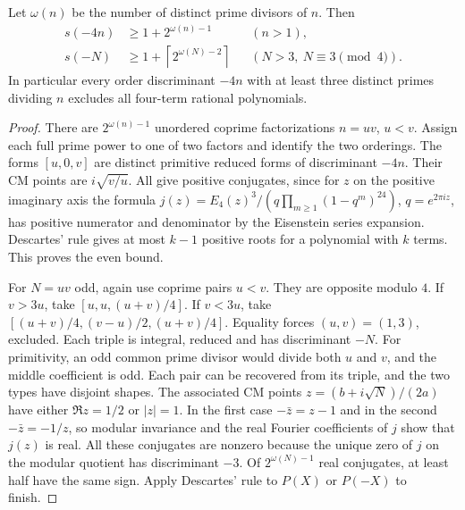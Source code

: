 \begin{proposition}
Let $\omega(n)$ be the number of distinct prime divisors of $n$. Then
\[
\begin{aligned}
 s(-4n)&\ge 1+2^{\omega(n)-1} &&(n>1),\\
 s(-N)&\ge 1+\left\lceil 2^{\omega(N)-2}\right\rceil
 &&(N>3,\ N\equiv3\pmod4).
\end{aligned}
\]
In particular every order discriminant $-4n$ with at least three distinct
primes dividing $n$ excludes all four-term rational polynomials.
\end{proposition}
\begin{proof}
There are $2^{\omega(n)-1}$ unordered coprime factorizations $n=uv$,
$u<v$. Assign each full prime power to one of two factors and identify the
two orderings. The forms $[u,0,v]$ are distinct primitive reduced forms
of discriminant $-4n$. Their CM points are $i\sqrt{v/u}$. All give positive
conjugates, since for $z$ on the positive imaginary axis the formula
$j(z)=E_4(z)^3/(q\prod_{m\ge1}(1-q^m)^{24})$, $q=e^{2\pi iz}$, has
positive numerator and denominator by the Eisenstein series expansion.
Descartes' rule gives at most $k-1$ positive roots for a polynomial with
$k$ terms. This proves the even bound.

For $N=uv$ odd, again use coprime pairs $u<v$. They are opposite modulo
$4$. If $v>3u$, take $[u,u,(u+v)/4]$. If $v<3u$, take
$[(u+v)/4,(v-u)/2,(u+v)/4]$. Equality forces $(u,v)=(1,3)$, excluded.
Each triple is integral, reduced and has discriminant $-N$. For
primitivity, an odd common prime divisor would divide both $u$ and $v$,
and the middle coefficient is odd. Each pair can be recovered from its
triple, and the two types have disjoint shapes. The associated CM points
$z=(b+i\sqrt N)/(2a)$ have either $\Re z=1/2$ or $|z|=1$. In the first
case $-\bar z=z-1$ and in the second $-\bar z=-1/z$, so modular invariance
and the real Fourier coefficients of $j$ show that $j(z)$ is real. All
these conjugates are nonzero because the unique zero of $j$ on the
modular quotient has discriminant $-3$. Of $2^{\omega(N)-1}$ real
conjugates, at least half have the same sign. Apply Descartes' rule to
$P(X)$ or $P(-X)$ to finish.
\end{proof}

